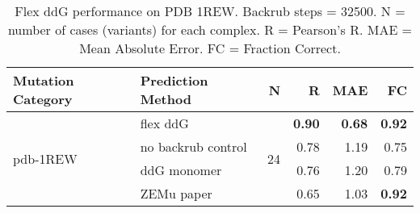 \begin{table}
  \begin{tabular}{llrrrr}
\toprule
Mutation Category &   Prediction Method &   N &    R &  MAE &   FC \\
\midrule
 \multirow{ 4}{*}{pdb-1REW} & flex ddG & \multirow{ 4}{*}{24} & \textbf{0.90} & \textbf{0.68} & \textbf{0.92}  \\
 & no backrub control & & 0.78 & 1.19 & 0.75  \\
 & ddG monomer & & 0.76 & 1.20 & 0.79  \\
 & ZEMu paper & & 0.65 & 1.03 & \textbf{0.92}  \\
\bottomrule
\end{tabular}
  \caption[Flex ddG performance on PDB 1REW]{
    Flex ddG performance on PDB 1REW. Backrub steps = 32500. N = number of cases (variants) for each complex. R = Pearson's R. MAE = Mean Absolute Error. FC = Fraction Correct.
  } \label{tab:table-pdb-1REW}
\end{table}

